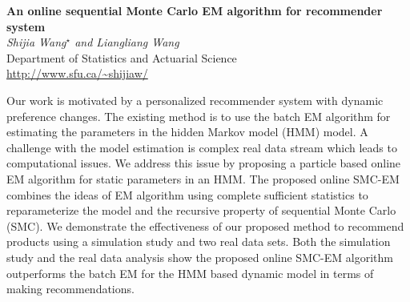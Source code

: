 \documentclass[12pt]{article}
\newcommand{\postertitle}[1]{{\Large\bf #1}\\[12pt]}
\newcommand{\authors}[1]{\emph{#1}\\}
\newcommand{\affiliations}[1]{{#1}\\}
\newcommand{\contacts}[1]{{#1}}
\begin{document}
\begin{center}
\vspace*{0.5cm}
%
\postertitle{An online sequential Monte Carlo EM algorithm for recommender system}
%
\authors{Shijia Wang$^\star$ and Liangliang Wang} %
% 
\affiliations{Department of Statistics and Actuarial Science}
%
\contacts{\url{http://www.sfu.ca/~shijiaw/}} %
%
\vspace*{0.3cm}
\end{center}

Our work is motivated by a personalized recommender system with dynamic preference changes.
The existing method is to use the batch EM algorithm for estimating the  parameters in the hidden Markov model (HMM) model. A challenge with the model estimation is complex real data stream which leads to computational issues. We address this issue by proposing a particle based online EM algorithm for static parameters in an HMM. The proposed online SMC-EM combines the ideas of EM algorithm using complete sufficient statistics to reparameterize the model and the recursive property of sequential Monte Carlo (SMC). We demonstrate the effectiveness of our proposed method to recommend products using a simulation study and two real data sets. Both the simulation study and the real data analysis show the proposed online SMC-EM algorithm outperforms the batch EM for the HMM based dynamic model in terms of making recommendations. 

\end{document}
